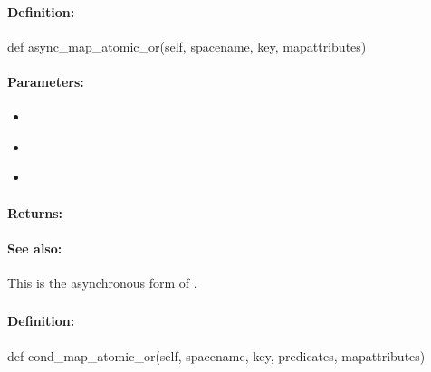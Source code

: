 \paragraph{Definition:}
\begin{pythoncode}
def async_map_atomic_or(self, spacename, key, mapattributes)
\end{pythoncode}

\paragraph{Parameters:}
\begin{itemize}[noitemsep]
\item {}\\

\item {}\\

\item {}\\

\end{itemize}

\paragraph{Returns:}


\paragraph{See also:}  This is the asynchronous form of .

\pagebreak
\subsubsection{}
\label{api:python:cond_map_atomic_or}


\paragraph{Definition:}
\begin{pythoncode}
def cond_map_atomic_or(self, spacename, key, predicates, mapattributes)
\end{pythoncode}

